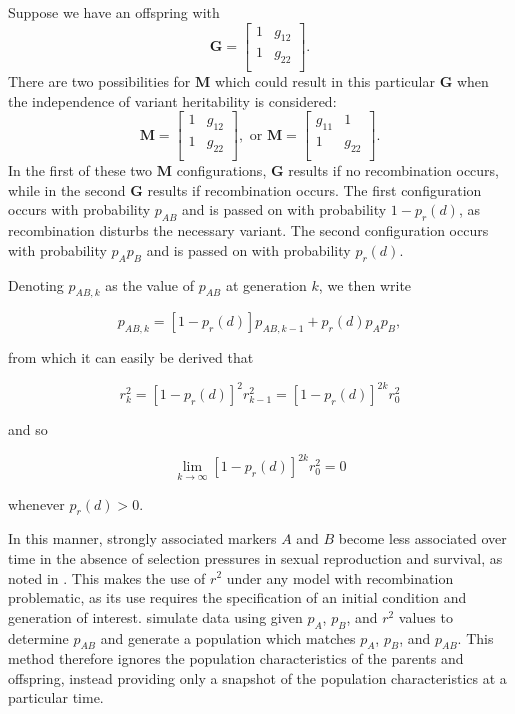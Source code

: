 \documentclass{article}
\newcommand{\m}[1]{\mathbf{#1}}               %
\begin{document}
Suppose we have an offspring with
$$\m{G} = \begin{bmatrix}
  1 & g_{12} \\
  1 & g_{22} \\
\end{bmatrix}.$$
There are two possibilities for $\m{M}$ which could result in this particular $\m{G}$ when the independence of variant heritability is considered:
$$\m{M} = \begin{bmatrix}
  1 & g_{12} \\
  1 & g_{22} \\
\end{bmatrix}, \text{ or }
\m{M} = \begin{bmatrix}
  g_{11} & 1 \\
  1 & g_{22} \\
\end{bmatrix}.$$
In the first of these two $\m{M}$ configurations, $\m{G}$ results if no recombination occurs, while in the second $\m{G}$ results if recombination occurs. The first configuration occurs with probability $p_{AB}$ and is passed on with probability $1 - p_r(d)$, as recombination disturbs the necessary variant. The second configuration occurs with probability $p_Ap_B$ and is passed on with probability $p_r(d)$.

Denoting $p_{AB,k}$ as the value of $p_{AB}$ at generation $k$, we then write

$$p_{AB,k} = [1 - p_r(d)] p_{AB,k-1} + p_r(d) p_A p_B,$$

\noindent from which it can easily be derived that

$$r^2_k = \left [ 1 - p_r(d) \right ]^2 r^2_{k-1} =  \left [ 1 - p_r(d) \right ]^{2k} r^2_0$$

\noindent and so

$$\lim_{k \rightarrow \infty} \left [ 1 - p_r(d) \right ]^{2k} r^2_0 = 0$$

\noindent whenever $p_r(d) > 0$.

In this manner, strongly associated markers $A$ and $B$ become less associated over time in the absence of selection pressures in sexual reproduction and survival, as noted in \cite{siegmundyakir2007}. This makes the use of $r^2$ under any model with recombination problematic, as its use requires the specification of an initial condition and generation of interest. \cite{LiJi2005} simulate data using given $p_A$, $p_B$, and $r^2$ values to determine $p_{AB}$ and generate a population which matches $p_A$, $p_B$, and $p_{AB}$. This method therefore ignores the population characteristics of the parents and offspring, instead providing only a snapshot of the population characteristics at a particular time.
\end{document}

